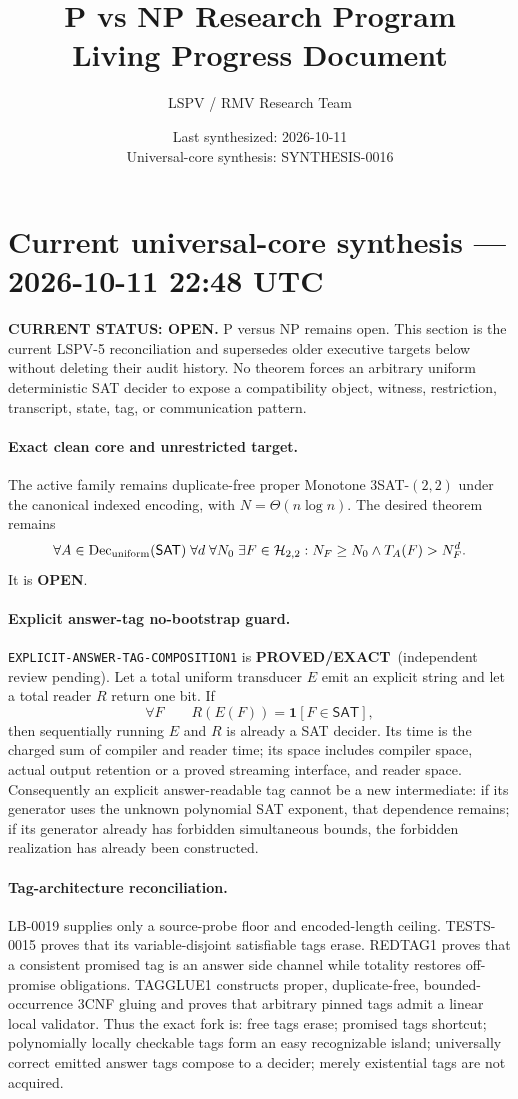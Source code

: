 \documentclass[11pt]{article}
\title{\bfseries P vs NP Research Program\\[0.25em]
\Large Living Progress Document}
\author{LSPV / RMV Research Team}
\date{Last synthesized: 2026-10-11\\ Universal-core synthesis: SYNTHESIS-0016}
\newcommand{\statusproved}{\textcolor{proved}{\textbf{PROVED/EXACT}}}
\newcommand{\statusopen}{\textcolor{openstatus}{\textbf{OPEN}}}
\begin{document}
\section{Current universal-core synthesis --- 2026-10-11 22:48 UTC}

\begin{statusbox}
\textbf{CURRENT STATUS: OPEN.} P versus NP remains open. This section is the
current LSPV-5 reconciliation and supersedes older executive targets below
without deleting their audit history. No theorem forces an arbitrary uniform
deterministic SAT decider to expose a compatibility object, witness,
restriction, transcript, state, tag, or communication pattern.
\end{statusbox}

\paragraph{Exact clean core and unrestricted target.}
The active family remains duplicate-free proper Monotone $3$SAT-$(2,2)$ under
the canonical indexed encoding, with $N=\Theta(n\log n)$. The desired theorem
remains
\[
 \forall A\in\operatorname{Dec}_{\rm uniform}(\mathsf{SAT})\;
 \forall d\;\forall N_0\;\exists F\in\mathcal H_{2,2}:
 N_F\ge N_0\land T_A(F)>N_F^d.
\]
It is \statusopen.

\paragraph{Explicit answer-tag no-bootstrap guard.}
\texttt{EXPLICIT-ANSWER-TAG-COMPOSITION1} is \statusproved\ (independent
review pending). Let a total uniform transducer $E$ emit an explicit string
and let a total reader $R$ return one bit. If
\[
 \forall F\qquad R(E(F))=\mathbf 1[F\in\mathsf{SAT}],
\]
then sequentially running $E$ and $R$ is already a SAT decider. Its time is
the charged sum of compiler and reader time; its space includes compiler
space, actual output retention or a proved streaming interface, and reader
space. Consequently an explicit answer-readable tag cannot be a new
intermediate: if its generator uses the unknown polynomial SAT exponent, that
dependence remains; if its generator already has forbidden simultaneous
bounds, the forbidden realization has already been constructed.

\paragraph{Tag-architecture reconciliation.}
LB-0019 supplies only a source-probe floor and encoded-length ceiling.
TESTS-0015 proves that its variable-disjoint satisfiable tags erase.
REDTAG1 proves that a consistent promised tag is an answer side channel while
totality restores off-promise obligations. TAGGLUE1 constructs proper,
duplicate-free, bounded-occurrence 3CNF gluing and proves that arbitrary pinned
tags admit a linear local validator. Thus the exact fork is:
free tags erase; promised tags shortcut; polynomially locally checkable tags
form an easy recognizable island; universally correct emitted answer tags
compose to a decider; merely existential tags are not acquired.
\end{document}

